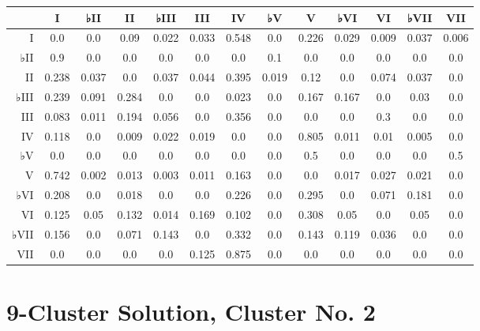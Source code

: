 \begin{table}[htbp]
\begin{minipage}{\linewidth}
\setlength{\tymax}{0.5\linewidth}
\centering
\small
\begin{tabulary}{\textwidth}{@{}RCCCCCCCCCCCC@{}} \toprule
&I&♭II&II&♭III&III&IV&♭V&V&♭VI&VI&♭VII&VII\\
\midrule
I&0.0&0.0&0.09&0.022&0.033&0.548&0.0&0.226&0.029&0.009&0.037&0.006\\
♭II&0.9&0.0&0.0&0.0&0.0&0.0&0.1&0.0&0.0&0.0&0.0&0.0\\
II&0.238&0.037&0.0&0.037&0.044&0.395&0.019&0.12&0.0&0.074&0.037&0.0\\
♭III&0.239&0.091&0.284&0.0&0.0&0.023&0.0&0.167&0.167&0.0&0.03&0.0\\
III&0.083&0.011&0.194&0.056&0.0&0.356&0.0&0.0&0.0&0.3&0.0&0.0\\
IV&0.118&0.0&0.009&0.022&0.019&0.0&0.0&0.805&0.011&0.01&0.005&0.0\\
♭V&0.0&0.0&0.0&0.0&0.0&0.0&0.0&0.5&0.0&0.0&0.0&0.5\\
V&0.742&0.002&0.013&0.003&0.011&0.163&0.0&0.0&0.017&0.027&0.021&0.0\\
♭VI&0.208&0.0&0.018&0.0&0.0&0.226&0.0&0.295&0.0&0.071&0.181&0.0\\
VI&0.125&0.05&0.132&0.014&0.169&0.102&0.0&0.308&0.05&0.0&0.05&0.0\\
♭VII&0.156&0.0&0.071&0.143&0.0&0.332&0.0&0.143&0.119&0.036&0.0&0.0\\
VII&0.0&0.0&0.0&0.0&0.125&0.875&0.0&0.0&0.0&0.0&0.0&0.0\\

\bottomrule

\end{tabulary}
\end{minipage}
\end{table}

\section{9-Cluster Solution, Cluster No. 2}
\label{9-clustersolutionclusterno.2}

